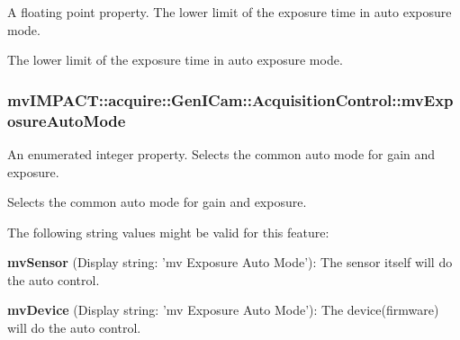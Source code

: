 A floating point property. The lower limit of the exposure time in auto exposure mode. 

The lower limit of the exposure time in auto exposure mode. \hypertarget{classmv_i_m_p_a_c_t_1_1acquire_1_1_gen_i_cam_1_1_acquisition_control_ac30d4c1772562361d0ed6a2e5c113aa4}{
\subsubsection[{mv\+Exposure\+Auto\+Mode}]{ mv\+I\+M\+P\+A\+C\+T\+::acquire\+::\+Gen\+I\+Cam\+::\+Acquisition\+Control\+::mv\+Exposure\+Auto\+Mode}}\label{classmv_i_m_p_a_c_t_1_1acquire_1_1_gen_i_cam_1_1_acquisition_control_ac30d4c1772562361d0ed6a2e5c113aa4}


An enumerated integer property. Selects the common auto mode for gain and exposure. 

Selects the common auto mode for gain and exposure.

The following string values might be valid for this feature\+:
\begin{DoxyItemize}
\item {\bfseries mv\+Sensor} (Display string\+: 'mv Exposure Auto Mode')\+: The sensor itself will do the auto control.
\item {\bfseries mv\+Device} (Display string\+: 'mv Exposure Auto Mode')\+: The device(firmware) will do the auto control.
\end{DoxyItemize}

